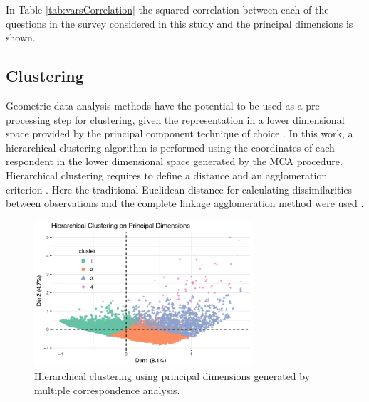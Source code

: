 \documentclass[conference,final,]{IEEEtran}
\begin{document}
In Table \ref{tab:varsCorrelation} the squared correlation between each
of the questions in the survey considered in this study and the
principal dimensions is shown.

\hypertarget{clustering}{%
\subsection{Clustering}\label{clustering}}

Geometric data analysis methods have the potential to be used as a
pre-processing step for clustering, given the representation in a lower
dimensional space provided by the principal component technique of
choice \cite{jolliffe2002principal}. In this work, a hierarchical
clustering algorithm is performed using the coordinates of each
respondent in the lower dimensional space generated by the MCA
procedure. Hierarchical clustering requires to define a distance and an
agglomeration criterion \cite{tan2013data}. Here the traditional
Euclidean distance for calculating dissimilarities between observations
and the complete linkage agglomeration method were used
\cite{ding2002cluster}.

\begin{figure}[h!] 
\centering 
\includegraphics[width=3.2in]{../figs/new_hclust.pdf}
\caption{Hierarchical clustering using principal dimensions generated by multiple correspondence analysis.}
\label{fig:hclust} 
\end{figure}
\end{document}
